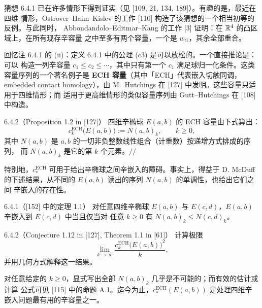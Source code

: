 猜想 6.4.1 已在许多情形下得到证实（见 [109, 21, 134, 189]）。有趣的是，最近在四维
情形，Ostrover--Haim--Kislev 的工作 [110] 构造了该猜想的一个相当初等的反例。与此同时，
Abbondandolo--Editmar--Kang 的工作 [3] 证明：在 $\mathbb{R}^4$ 的凸区域上，在所有现存辛容量
之中至多有两个容量，一个是 $w_G$，其余全部重合。


回忆注 6.4.1 的 (ii)：定义 6.4.1 中的公理 (c3) 是可以放松的。一个直接推论是：可以
构造一列辛容量 $c_1\le c_2\le\cdots$，其中只有第一个 $c_1$ 满足球归一化条件。这类
容量序列的一个著名例子是 \textbf{ECH 容量}（其中「ECH」代表嵌入切触同调，embedded
contact homology），由 M.~Hutchings 在 [127] 中发明。这些容量只适用于四维情形；而
适用于更高维情形的类似容量序列由 Gutt--Hutchings 在 [108] 中构造。

\begin{wexam}{6.4.2（Proposition 1.2 in [127]）}
  四维辛椭球 $E(a,b)$ 的 ECH 容量由下式算出：
  \[
    c_k^{\mathrm{ECH}}\bigl(E(a,b)\bigr):=N(a,b)_k,
    \qquad k\ge0,
  \]
  其中 $N(a,b)$ 是 $a,b$ 的一切非负整数线性组合（计重数）按递增方式排成的序列，
  而 $N(a,b)_k$ 是它的第 $k$ 个元素。\hfill$//$
\end{wexam}

特别地，$c_*^{\mathrm{ECH}}$ 可用于给出辛椭球之间辛嵌入的障碍。事实上，得益于 D.
McDuff 的下述结果，从不同的 $E(a,b)$ 读出的序列 $N(a,b)$ 的单调性，也给出它们之间
辛嵌入的存在性。

\begin{wthm}{6.4.1（[152] 中的定理 1.1）}
  对任意四维辛椭球 $E(a,b)$ 与 $E(c,d)$，$E(a,b)$ 辛嵌入到 $E(c,d)$ 中当且仅当对
  任意 $k\ge0$ 有 $N(a,b)_k\le N(c,d)_k$。
\end{wthm}

\begin{wexer}{6.4.2（Conjecture 1.12 in [127], Theorem 1.1 in [61]）}
  计算极限
  \[
    \lim_{k\to\infty}
    \frac{c_k^{\mathrm{ECH}}\bigl(E(a,b)\bigr)^2}{k},
  \]
  并用几何方式解释这一结果。
\end{wexer}

对任意给定的 $k\ge0$，显式写出全部 $N(a,b)_k$ 几乎是不可能的；而有效的估计或计算
公式可见 [115] 中的命题 A.1。迄今为止，$c_*^{\mathrm{ECH}}(E(a,b))$ 是处理四维辛
嵌入问题最有用的辛容量之一。

